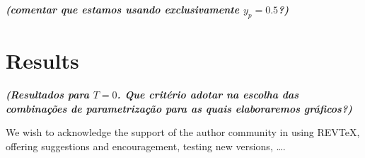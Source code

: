 \documentclass[prc, reprint, amsmath, linenumbers,10pt]{revtex4-1}
\newcommand{\comment}[1]{{\bf\textit{#1}}}
\begin{document}
\comment{(comentar que estamos usando exclusivamente $y_p = 0.5$?)}

\section{Results}

\comment{(Resultados para $T = 0$. Que critério adotar na escolha das combinações de parametrização para as quais elaboraremos gráficos?)}


%
%

\begin{acknowledgments}
We wish to acknowledge the support of the author community in using
REV\TeX{}, offering suggestions and encouragement, testing new versions,
\dots.
\end{acknowledgments}






\end{document}
